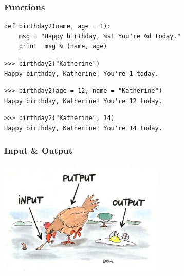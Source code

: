 \documentclass[t,10pt,compress=false,usepdftitle=false]{beamer}
\begin{document}
\begin{frame}[fragile]
    \frametitle{Functions}
    \begin{myColorBox}{0.9}{}
\begin{verbatim}
def birthday2(name, age = 1):
    msg = "Happy birthday, %s! You're %d today."
    print  msg % (name, age)
\end{verbatim}
    \end{myColorBox}
\pause
    \begin{myColorBox}{0.9}{}
\begin{verbatim}
>>> birthday2("Katherine")
Happy birthday, Katherine! You're 1 today.
\end{verbatim}
    \end{myColorBox}
\pause
    \begin{myColorBox}{0.9}{}
\begin{verbatim}
>>> birthday2(age = 12, name = "Katherine")
Happy birthday, Katherine! You're 12 today.
\end{verbatim}
    \end{myColorBox}
\pause
    \begin{myColorBox}{0.9}{}
\begin{verbatim}
>>> birthday2("Katherine", 14)
Happy birthday, Katherine! You're 14 today.
\end{verbatim}
    \end{myColorBox}
\end{frame}

\begin{frame}[fragile]
    \frametitle{Input \& Output}
    \begin{center}
      \includegraphics[width=0.6\textwidth]{io.jpg}
    \end{center}
\end{frame}
\end{document}
